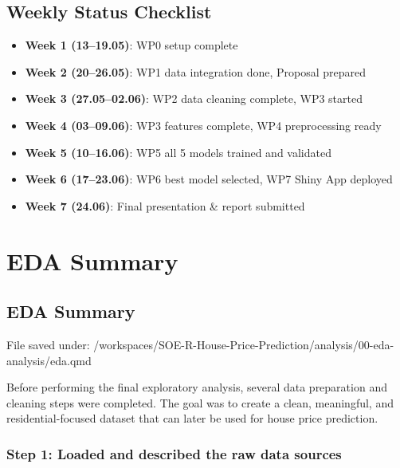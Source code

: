 \documentclass[
  english,
  letterpaper,
  DIV=11,
  numbers=noendperiod]{scrreprt}
\providecommand{\tightlist}{%
  \setlength{\itemsep}{0pt}\setlength{\parskip}{0pt}}
\begin{document}
\section{Weekly Status Checklist}\label{weekly-status-checklist}

\begin{itemize}
\tightlist
\item[$\boxtimes$]
  \textbf{Week 1 (13--19.05)}: WP0 setup complete
\item[$\boxtimes$]
  \textbf{Week 2 (20--26.05)}: WP1 data integration done, Proposal
  prepared
\item[$\boxtimes$]
  \textbf{Week 3 (27.05--02.06)}: WP2 data cleaning complete, WP3
  started
\item[$\boxtimes$]
  \textbf{Week 4 (03--09.06)}: WP3 features complete, WP4 preprocessing
  ready
\item[$\boxtimes$]
  \textbf{Week 5 (10--16.06)}: WP5 all 5 models trained and validated
\item[$\boxtimes$]
  \textbf{Week 6 (17--23.06)}: WP6 best model selected, WP7 Shiny App
  deployed
\item[$\boxtimes$]
  \textbf{Week 7 (24.06)}: Final presentation \& report submitted
\end{itemize}


\chapter{EDA Summary}\label{eda-summary}

\section{EDA Summary}\label{eda-summary-1}

File saved under:
/workspaces/SOE-R-House-Price-Prediction/analysis/00-eda-analysis/eda.qmd

Before performing the final exploratory analysis, several data
preparation and cleaning steps were completed. The goal was to create a
clean, meaningful, and residential-focused dataset that can later be
used for house price prediction.

\subsection{Step 1: Loaded and described the raw data
sources}\label{step-1-loaded-and-described-the-raw-data-sources}
\end{document}
